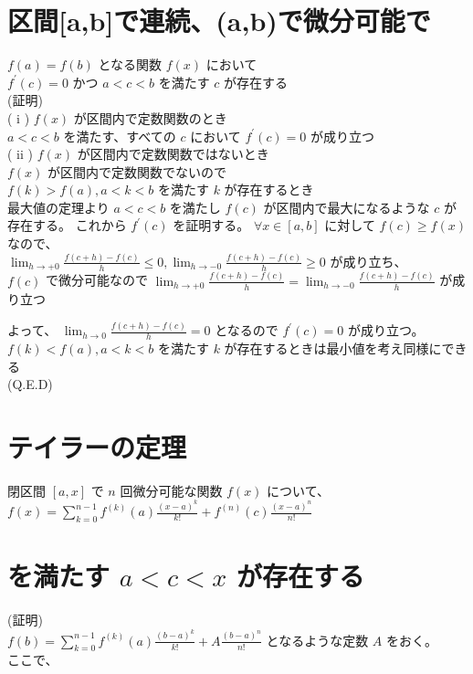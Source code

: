 \documentclass[10pt]{article}
\begin{document}
\section*{区間[a,b]で連続、(a,b)で微分可能で}
$f(a)=f(b)$ となる関数 $f(x)$ において\\
$f^{\prime}(c)=0$ かつ $a<c<b$ を満たす $c$ が存在する\\
(証明)\\
( i ) $f(x)$ が区間内で定数関数のとき\\
$a<c<b$ を満たす、すべての $c$ において $f^{\prime}(c)=0$ が成り立つ\\
( ii ) $f(x)$ が区間内で定数関数ではないとき\\
$f(x)$ が区間内で定数関数でないので\\
$f(k)>f(a), a<k<b$ を満たす $k$ が存在するとき\\
最大値の定理より $a<c<b$ を満たし $f(c)$ が区間内で最大になるような $c$ が存在する。 これから $f^{\prime}(c)$ を証明する。 $\forall x \in[a, b]$ に対して $f(c) \geq f(x)$ なので、\\
$\lim _{h \rightarrow+0} \frac{f(c+h)-f(c)}{h} \leq 0, \lim _{h \rightarrow-0} \frac{f(c+h)-f(c)}{h} \geq 0$ が成り立ち、\\
$f(c)$ で微分可能なので $\lim _{h \rightarrow+0} \frac{f(c+h)-f(c)}{h}=\lim _{h \rightarrow-0} \frac{f(c+h)-f(c)}{h}$ が成り立つ

よって、 $\lim _{h \rightarrow 0} \frac{f(c+h)-f(c)}{h}=0$ となるので $f^{\prime}(c)=0$ が成り立つ。\\
$f(k)<f(a), a<k<b$ を満たす $k$ が存在するときは最小値を考え同様にできる\\
(Q.E.D)

\section*{テイラーの定理}
閉区間 $[a, x]$ で $n$ 回微分可能な関数 $f(x)$ について、\\
$f(x)=\sum_{k=0}^{n-1} f^{(k)}(a) \frac{(x-a)^{k}}{k!}+f^{(n)}(c) \frac{(x-a)^{n}}{n!}$

\section*{を満たす $a<c<x$ が存在する}
(証明)\\
$f(b)=\sum_{k=0}^{n-1} f^{(k)}(a) \frac{(b-a)^{k}}{k!}+A \frac{(b-a)^{n}}{n!}$ となるような定数 $A$ をおく。\\
ここで、
\end{document}
